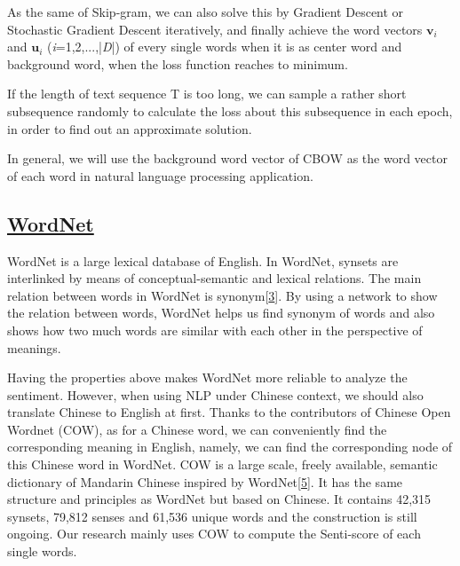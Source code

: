\documentclass[10pt, conference, compsocconf]{IEEEtran}
\begin{document}
As the same of Skip-gram, we can also solve this by Gradient Descent or Stochastic Gradient Descent iteratively, and finally achieve the word vectors $\textbf{v}_{i}$ and $\textbf{u}_{i}$ (\textit{i}=1,2,...,\big|\textit{D}\big|) of every single words when it is as center word and background word, when the loss function reaches to minimum.

If the length of text sequence T is too long, we can sample a rather short subsequence randomly to calculate the loss about this subsequence in each epoch, in order to find out an approximate solution.

In general, we will use the background word vector of CBOW as the word vector of each word in natural language processing application.

\vspace{0.5cm}
\subsection{\underline{WordNet}}

WordNet is a large lexical database of English. In WordNet, synsets are interlinked by means of conceptual-semantic and lexical relations. The main relation between words in WordNet is synonym[\hyperref[ref 3]{3}]. By using a network to show the relation between words, WordNet helps us find synonym of words and also shows how two much words are similar with each other in the perspective of meanings.


Having the properties above makes WordNet more reliable to analyze the sentiment. However, when using NLP under Chinese context, we should also translate Chinese to English at first. Thanks to the contributors of Chinese Open Wordnet (COW), as for a Chinese word, we can conveniently find the corresponding meaning in English, namely, we can find the corresponding node of this Chinese word in WordNet. COW is a large scale, freely available, semantic dictionary of Mandarin Chinese inspired by WordNet[\hyperref[ref 5]{5}]. It has the same structure and principles as WordNet but based on Chinese. It contains 42,315 synsets, 79,812 senses and 61,536 unique words and the construction is still ongoing. Our research mainly uses COW to compute the Senti-score of each single words.
\end{document}
